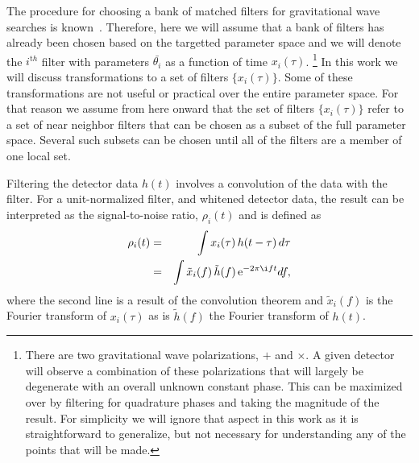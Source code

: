 The procedure for choosing a bank of matched filters for gravitational wave
searches is known~\cite{Owen:1995tm}. Therefore, here we will assume that a
bank of filters has already been chosen based on the targetted parameter space
and we will denote the $i^{\mathrm th}$ filter with parameters $\bar{\theta_i}$
as a function of time $x_i(\tau)$.%
%
\footnote{There are two gravitational wave polarizations, $+$ and $\times$. A
given detector will observe a combination of these polarizations that will
largely be degenerate with an overall unknown constant phase.  This can be
maximized over by filtering for quadrature phases and taking the magnitude of
the result. For simplicity we will ignore that aspect in this work as it is
straightforward to generalize, but not necessary for understanding any of the
points that will be made.}
%
In this work we will discuss transformations to a set of filters
$\{x_i(\tau)\}$.  Some of these transformations are not useful or practical
over the entire parameter space.  For that reason we assume from here onward
that the set of filters $\{x_i(\tau)\}$ refer to a set of near neighbor filters
that can be chosen as a subset of the full parameter space.  Several such
subsets can be chosen until all of the filters are a member of one local set.  

Filtering the detector data $h(t)$ involves a convolution of the data with the
filter.  For a unit-normalized filter, and whitened detector data, the result
can be interpreted as the signal-to-noise ratio, $\rho_i(t)$ and is defined as
%
%
\begin{eqnarray}
\rho_i(t) &=& \int x_i(\tau) \, h(t-\tau) \, d \tau \label{eq:SNRTD} \\
          &=& \int \tilde{x}_i(f) \, \tilde{h}(f) \, \e^{-2\pi\i ft} \label{eq:SNRFD} df,
\end{eqnarray}
%
%
where the second line is a result of the convolution theorem and
$\tilde{x}_i(f)$ is the Fourier transform of $x_i(\tau)$ as is $\tilde{h}(f)$ the
Fourier transform of $h(t)$.

